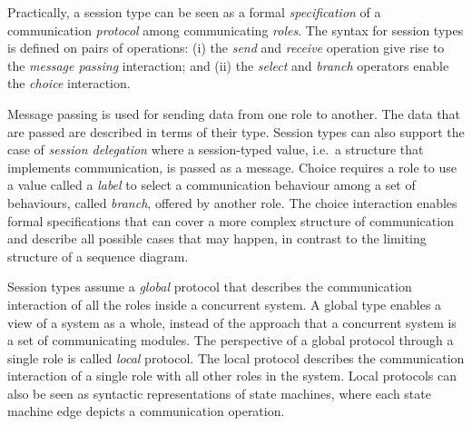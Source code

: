 
Practically, a session type can be seen as a formal
{\em specification} of a communication {\em protocol} among communicating {\em roles}.
The syntax for session types is defined on pairs of operations:
(i) the {\em send} and {\em receive} operation give rise to
the {\em message passing} interaction; and
(ii) the {\em select} and {\em branch} operators enable the
{\em choice} interaction.

Message passing is used for sending data from one role to another.
The data that are passed are described in terms of their type. Session
types can also support the case of {\em session delegation}
where a session-typed value, i.e.~a structure that implements communication,
is passed as a message.
Choice requires a role to use a value called a {\em label}
to select a communication behaviour among
a set of behaviours, called {\em branch}, offered by another role.
The choice interaction enables formal specifications that can
cover a more complex structure of communication and describe all possible
cases that may happen, in contrast to the limiting structure of
a sequence diagram.

Session types assume a {\em global} protocol that describes the
communication interaction of all the roles inside a concurrent system.
A global type enables a view of a system as a whole, instead of the 
approach that a concurrent system is a set of communicating modules.
The perspective of a global protocol through a single role
is called {\em local} protocol. The local protocol describes
the communication interaction of a single role with all other roles
in the system. Local protocols can also be seen as syntactic
representations of state machines, where each state machine edge
depicts a communication operation.

